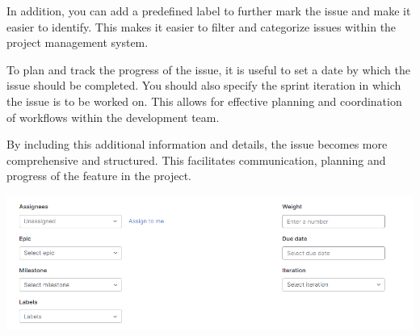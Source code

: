 \documentclass[12pt]{article}
\begin{document}
In addition, you can add a predefined label to further mark the issue and make it easier to identify. This makes it easier to filter and categorize issues within the project management system.

To plan and track the progress of the issue, it is useful to set a date by which the issue should be completed. You should also specify the sprint iteration in which the issue is to be worked on. This allows for effective planning and coordination of workflows within the development team.

By including this additional information and details, the issue becomes more comprehensive and structured. This facilitates communication, planning and progress of the feature in the project.

 \includegraphics[width=\textwidth]{issue2.png}
 
\end{document}
